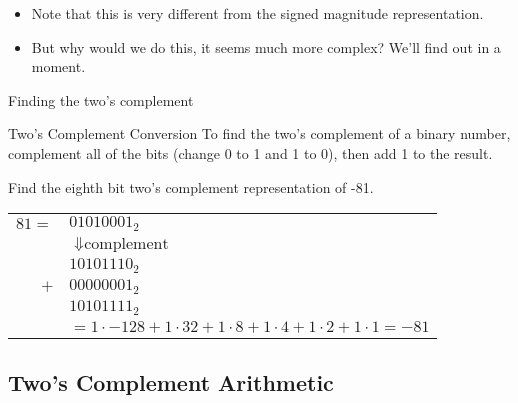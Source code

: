 \begin{itemize}
  \item Note that this is very different from the signed magnitude representation.
  \item But why would we do this, it seems much more complex?  We'll find out in a moment.
\end{itemize}

\begin{frame}{Finding the two's complement}
  \begin{block}{Two's Complement Conversion}
    To find the two's complement of a binary number, complement all of the bits (change 0 to 1 and 1 to 0), then add 1 to the result.
  \end{block}
  \begin{example}
    Find the eighth bit two's complement representation of -81.
    \begin{tabular}{rl}
      $81 =$ & $01010001_2$\\
             & $\Downarrow \text{complement}$\\
             & $10101110_2$\\
         $+$ & $00000001_2$\\
             & $10101111_2$\\
             & $= 1 \cdot -128 + 1 \cdot 32 + 1 \cdot 8 + 1 \cdot 4 + 1 \cdot 2 + 1 \cdot 1 = -81$
    \end{tabular}
  \end{example}
\end{frame}

\subsection{Two's Complement Arithmetic}

